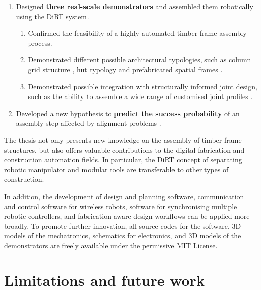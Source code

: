 \begin{enumerate}
	\item Designed \textbf{three real-scale demonstrators} and assembled them robotically using the DiRT system.
	\begin{enumerate}
		\item Confirmed the feasibility of a highly automated timber frame assembly process. 

		\item Demonstrated different possible architectural typologies, such as column grid structure , hut typology  and prefabricated spatial frames .

		\item Demonstrated possible integration with structurally informed joint design, such as the ability to assemble a wide range of customised joint profiles .
	\end{enumerate}

	\item Developed a new hypothesis to \textbf{predict the success probability} of an assembly step affected by alignment problems .

\end{enumerate}

The thesis not only presents new knowledge on the assembly of timber frame structures, but also offers valuable contributions to the digital fabrication and construction automation fields. In particular, the DiRT concept of separating robotic manipulator and modular tools are transferable to other types of construction. 

In addition, the development of design and planning software, communication and control software for wireless robots, software for synchronising multiple robotic controllers, and fabrication-aware design workflows can be applied more broadly. To promote further innovation, all source codes for the software, 3D models of the mechatronics, schematics for electronics, and 3D models of the demonstrators are freely available under the permissive MIT License. 

\section{Limitations and future work}
\label{section:limitations}

